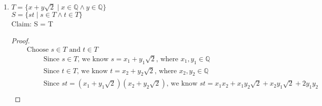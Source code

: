 \documentclass{article}
\begin{document}
\begin{enumerate}
\begin{enumerate}
\begin{proof}
\begin{align*}
                &3. \hspace{1cm} \quad \text{Since } y \text{ is rational, there exist integers } p_2,q_2 \text{ where } x = \frac{p_2}{q_2} \text{ and } q_2 \neq 0 \\
                &4. \hspace{1cm} \quad \text{Since } x + y = \frac{p_1}{q_1} + \frac{p_2}{q_2} \text{, we know } x + y = \frac{p_1q_2 + p_2q_1}{q_1q_2} \\
                &5. \hspace{1cm} \quad \text{Let } R = p_1q_2 + p_2q_1 \text{ and } S = q_1q_2 \\
                &6. \hspace{1cm} \quad \text{Since } p_1 \text{ and } p_2 \text{ are integers, and } q_1 \text{ and } q_2 \text{ are non-zero integers, we know that } R \text{ is an integer } \\
                & \hspace{1.3cm} \quad \text{and } S \text{ is a non-zero integer} \\
                &7. \quad \text{Since } R \text{ is an integer and } S \text{ is a non-zero integer, we know that } x + y \text{ is rational} \\
            \end{align*}
        \end{proof}
        \item $T = \{x+y \sqrt{2} \mid x \in \mathbb{Q} \land y \in \mathbb{Q} \}$ \\
        $S = \{st \mid s \in T \land t \in T \}$ \\
        Claim: S = T
        \begin{proof}
            \begin{align}
                &\quad \text{Choose } s \in T \text{ and } t \in T \\
                &\quad \hspace{1cm} \text{Since } s \in T \text{, we know } s = x_1 + y_1 \sqrt{2} \text{, where } x_1,y_1 \in \mathbb{Q} \\
                &\quad \hspace{1cm} \text{Since } t \in T \text{, we know } t = x_2 + y_2 \sqrt{2} \text{, where } x_2,y_2 \in \mathbb{Q} \\
                &\quad \hspace{1cm} \text{Since } st = (x_1 + y_1 \sqrt{2})(x_2 + y_2 \sqrt{2}) \text{, we know } st = x_1x_2 + x_1y_2 \sqrt{2} + x_2y_1 \sqrt{2} + 2y_1y_2 \\

\end{align}
\end{proof}
\end{enumerate}
\end{enumerate}
\end{document}
